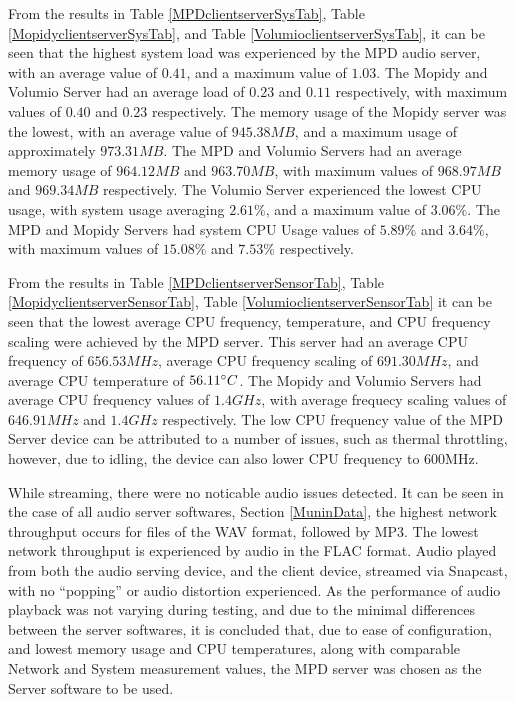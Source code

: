 \documentclass[11pt,a4paper,headinclude=false,footinclude=false]{scrreprt}
\begin{document}
From the results in Table \ref{MPDclientserverSysTab}, Table
\ref{MopidyclientserverSysTab}, and Table
\ref{VolumioclientserverSysTab}, it can be seen that the highest system
load was experienced by the MPD audio server, with an average value of
\(0.41\), and a maximum value of \(1.03\). The Mopidy and Volumio Server
had an average load of \(0.23\) and \(0.11\) respectively, with maximum
values of \(0.40\) and \(0.23\) respectively. The memory usage of the
Mopidy server was the lowest, with an average value of \(945.38MB\), and
a maximum usage of approximately \(973.31MB\). The MPD and Volumio
Servers had an average memory usage of \(964.12MB\) and \(963.70MB\),
with maximum values of \(968.97MB\) and \(969.34MB\) respectively. The
Volumio Server experienced the lowest CPU usage, with system usage
averaging \(2.61\%\), and a maximum value of \(3.06\%\). The MPD and
Mopidy Servers had system CPU Usage values of \(5.89\%\) and \(3.64\%\),
with maximum values of \(15.08\%\) and \(7.53\%\) respectively.

From the results in Table \ref{MPDclientserverSensorTab}, Table
\ref{MopidyclientserverSensorTab}, Table
\ref{VolumioclientserverSensorTab} it can be seen that the lowest
average CPU frequency, temperature, and CPU frequency scaling were
achieved by the MPD server. This server had an average CPU frequency of
\(656.53MHz\), average CPU frequency scaling of \(691.30MHz\), and
average CPU temperature of \(56.11 \degree C\). The Mopidy and Volumio
Servers had average CPU frequency values of \(1.4GHz\), with average
frequecy scaling values of \(646.91MHz\) and \(1.4GHz\) respectively.
The low CPU frequency value of the MPD Server device can be attributed
to a number of issues, such as thermal throttling, however, due to
idling, the device can also lower CPU frequency to 600MHz\cite{RPiFreq}.

While streaming, there were no noticable audio issues detected. It can
be seen in the case of all audio server softwares, Section
\ref{MuninData}, the highest network throughput occurs for files of the
WAV format, followed by MP3. The lowest network throughput is
experienced by audio in the FLAC format. Audio played from both the
audio serving device, and the client device, streamed via Snapcast, with
no ``popping'' or audio distortion experienced. As the performance of
audio playback was not varying during testing, and due to the minimal
differences between the server softwares, it is concluded that, due to
ease of configuration, and lowest memory usage and CPU temperatures,
along with comparable Network and System measurement values, the MPD
server was chosen as the Server software to be used.
\end{document}
